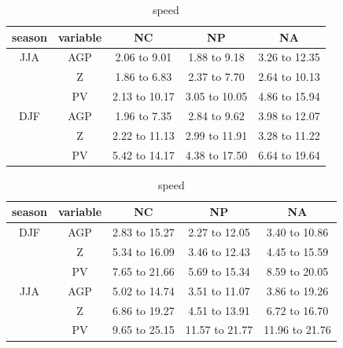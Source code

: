 \documentclass[smallextended]{svjour3}       %
\numberwithin{equation}{section}
\begin{document}
\begin{table}[b]
    \caption{speed}
    \centering
    \begin{tabular}{c|c|c|c|c}
season&variable & NC & NP & NA \\ 
  \hline
JJA & AGP& 2.06 to 9.01 & 1.88 to 9.18 & 3.26 to 12.35 \\ 
&Z & 1.86 to 6.83 & 2.37 to 7.70 & 2.64 to 10.13 \\ 
&PV & 2.13 to 10.17 & 3.05 to 10.05 & 4.86 to 15.94 \\ 
\hline
  DJF & AGP & 1.96 to 7.35 & 2.84 to 9.62 & 3.98 to 12.07 \\ 
    &Z & 2.22 to 11.13 & 2.99 to 11.91 & 3.28 to 11.22 \\
    &PV & 5.42 to 14.17 & 4.38 to 17.50 & 6.64 to 19.64 \\ 
    \end{tabular}
        \begin{tabular}{c|c|c|c|c}
season&variable & NC & NP & NA \\ 
  \hline
DJF & AGP & 2.83 to 15.27 & 2.27 to 12.05 & 3.40 to 10.86 \\  
&Z  & 5.34 to 16.09 & 3.46 to 12.43 & 4.45 to 15.59 \\  
&PV& 7.65 to 21.66 & 5.69 to 15.34 & 8.59 to 20.05 \\  
\hline
  JJA & AGP & 5.02 to 14.74 & 3.51 to 11.07 & 3.86 to 19.26 \\ 
    &Z & 6.86 to 19.27 & 4.51 to 13.91 & 6.72 to 16.70 \\ 
    &PV& 9.65 to 25.15 & 11.57 to 21.77 & 11.96 to 21.76 \\ 
    \end{tabular}
    \label{tab:duration}
\end{table}
\end{document}
